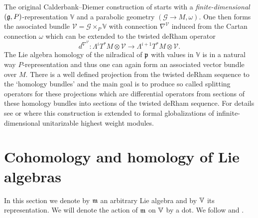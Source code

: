\documentclass[12pt,a4paper,final]{report}
\begin{document}
The original Calderbank--Diemer construction of \cite{calderbank_differential_2001} starts with a \emph{finite-dimensional} $(\mathfrak{g}, P)$-representation $\mathbb{V}$ and a parabolic geometry $(\mathcal{G} \to M, \omega).$ One then forms the associated bundle $\mathcal{V} = \mathcal{G}\times_P \mathbb{V}$ with connection $\nabla^\mathcal{V}$ induced from the Cartan connection $\omega$ which can be extended to the twisted deRham operator 
\[
d^{\nabla^\mathcal{V}} \colon \Lambda^i T^*M \otimes \mathcal{V} \to \Lambda^{i+1} T^*M \otimes \mathcal{V}.
\]
The Lie algebra homology of the nilradical of $\mathfrak{p}$ with values in $\mathbb{V}$ is in a natural way $P$-representation and thus one can again form an associated vector bundle over $M$. There is a well defined projection from the twisted deRham sequence to the `homology bundles' and the main goal is to produce so called splitting operators for these projections which are differential operators from sections of these homology bundles into sections of the twisted deRham sequence. For details see \cite{calderbank_differential_2001} or \cite{tucek_yamabe_2012} where  this construction is extended to formal globalizations of infinite-dimensional unitarizable highest weight modules.


\section{Cohomology and homology of Lie algebras}

In this section we denote by $\mathfrak{m}$ an arbitrary Lie algebra and by $\mathbb{V}$ its representation. We will denote the action of $\mathfrak{m}$ on $\mathbb{V}$ by a dot. We follow \cite{kostant_lie_1961} and \cite{cap_parabolic_2009}.
\end{document}
